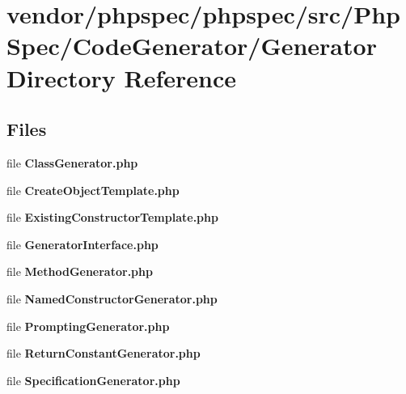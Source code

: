 \section{vendor/phpspec/phpspec/src/\+Php\+Spec/\+Code\+Generator/\+Generator Directory Reference}
\label{dir_53d27fd36b6c6503bdc62f78c0d33425}
\subsection*{Files}
\begin{DoxyCompactItemize}
\item 
file {\bf Class\+Generator.\+php}
\item 
file {\bf Create\+Object\+Template.\+php}
\item 
file {\bf Existing\+Constructor\+Template.\+php}
\item 
file {\bf Generator\+Interface.\+php}
\item 
file {\bf Method\+Generator.\+php}
\item 
file {\bf Named\+Constructor\+Generator.\+php}
\item 
file {\bf Prompting\+Generator.\+php}
\item 
file {\bf Return\+Constant\+Generator.\+php}
\item 
file {\bf Specification\+Generator.\+php}
\end{DoxyCompactItemize}
